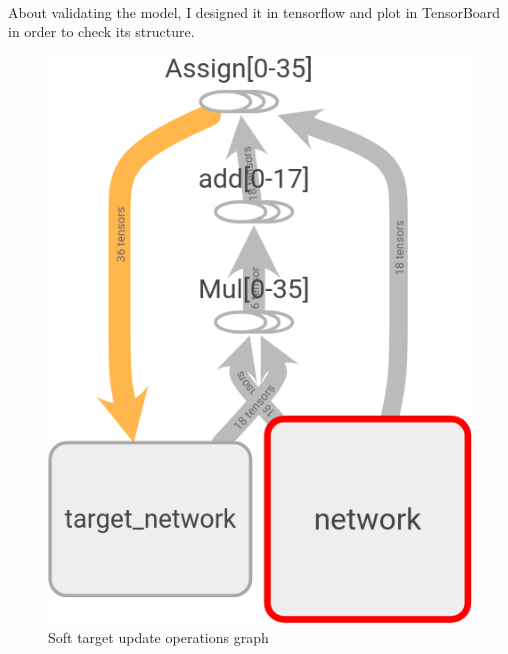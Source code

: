 \documentclass{article}
\begin{document}
\paragraph{}
About validating the model, I designed it in tensorflow and plot in TensorBoard
in order to check its structure.

\begin{figure}[ht]
  \centering
  \includegraphics[width=\textwidth]{soft_target}
  \caption{Soft target update operations graph}
  \label{fig:softtargetgraph}
\end{figure}
\end{document}
